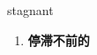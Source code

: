 
\begin{frame}
{\huge stagnant}
\begin{center}
\begin{enumerate}\Large
  \item \textbf{停滞不前的}
\end{enumerate}
\end{center}
\end{frame}
